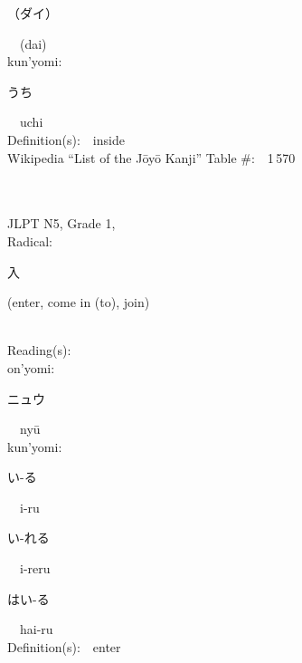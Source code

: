 \begin{multicols}{2}
{\hspace*{2em}}{\begin{CJK}{UTF8}{min} （ダイ） \end{CJK}}\ \ (dai)\ \ \\
{\hspace*{1em}}kun'yomi:\ \ \\
{\hspace*{2em}}{\begin{CJK}{UTF8}{min} うち \end{CJK}}\ \ uchi\ \ \\
Definition(s):\ \ inside \\
Wikipedia ``List of the J\=oy\=o Kanji'' Table \#:\ \ 1\,570 \\
\ \ \\
{\fontsize{34pt}{40pt}  }\ \ \\  %
{JLPT N5, Grade 1, \\Radical:\ \ {\begin{CJK}{UTF8}{min} 入 \end{CJK}} (enter, come in (to), join) } \\
Reading(s):\ \ \\
{\hspace*{1em}}on'yomi:\ \ \\
{\hspace*{2em}}{\begin{CJK}{UTF8}{min} ニュウ \end{CJK}}\ \ ny\=u\ \ \\
{\hspace*{1em}}kun'yomi:\ \ \\
{\hspace*{2em}}{\begin{CJK}{UTF8}{min} い-る \end{CJK}}\ \ i-ru\ \ \\
{\hspace*{2em}}{\begin{CJK}{UTF8}{min} い-れる \end{CJK}}\ \ i-reru\ \ \\
{\hspace*{2em}}{\begin{CJK}{UTF8}{min} はい-る \end{CJK}}\ \ hai-ru\ \ \\
Definition(s):\ \ enter \\

\end{multicols}
